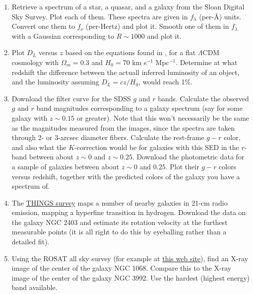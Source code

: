 \begin{enumerate}
\item Retrieve a spectrum of a star, a quasar, and a galaxy from the
  Sloan Digital Sky Survey. Plot each of them. These spectra are given
  in $f_\lambda$ (per-\AA) units. Convert one them to $f_\nu$
  (per-Hertz) and plot it. Smooth one of them in $f_\lambda$ with a
  Gaussian corresponding to $R\sim 1000$ and plot it.
\item Plot $D_L$ versus $z$ based on the equations found
  in \citet{hogg99cosm}, for a flat $\Lambda$CDM cosmology with
  $\Omega_m = 0.3$ and $H_0 = 70$ km s$^{-1}$ Mpc$^{-1}$. Determine at
  what redshift the difference between the actuall inferred luminosity
  of an object, and the luminosity assuming $D_L = cz / H_0$, would
  reach 1\%.
\item Download the filter curve for the SDSS $g$ and $r$
  bands. Calculate the observed $g$ and $r$ band magnitudes
  corresponding to a galaxy spectrum (say for some galaxy with $z \sim
  0.15$ or greater). Note that this won't necessarily be the same as
  the magnitudes measured from the images, since the spectra are taken
  through 2- or 3-arcsec diameter fibers. Calculate the rest-frame
  $g-r$ color, and also what the $K$-correction would be for galaxies
  with this SED in the $r$-band between about $z\sim 0$ and $z\sim
  0.25$. Download the photometric data for a sample of galaxies
  between about $z\sim 0$ and
  $0.25$. Plot their $g-r$ colors versus redshift, together with the
  predicted colors of the galaxy you have a spectrum of.
\item The \href{http://www.mpia.de/THINGS}{THINGS survey} maps a
  number of nearby galaxies in 21-cm radio emission, mapping a
  hyperfine transition in hydrogen. Download the data on the galaxy
  NGC 2403 and estimate its rotation velocity at the furthest
  measurable points (it is all right to do this by eyeballing rather
  than a detailed fit).
\item Using the ROSAT all sky survey (for example
  at \href{http://www.xray.mpe.mpg.de/cgi-bin/rosat/rosat-survey}{this
  web site}), find an X-ray image of the center of the galaxy NGC
  1068. Compare this to the X-ray image of the center of the galaxy
  NGC 3992. Use the hardest (highest energy) band available.
\end{enumerate}


  
